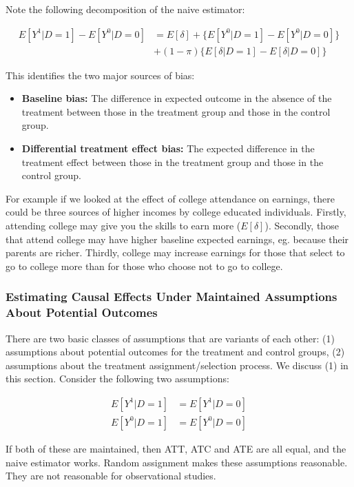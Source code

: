 \documentclass[12 pt, leqno]{article}
\begin{document}
Note the following decomposition of the naive estimator:

\begin{align*}
E[Y^1|D=1] - E[Y^0|D = 0] &= E[\delta] + \{E[Y^0|D = 1] - E[Y^0|D = 0] \} \\
&+ (1-\pi)\{E[\delta|D = 1] - E[\delta | D = 0] \}
\end{align*}

This identifies the two major sources of bias:

\begin{itemize}
\item \textbf{Baseline bias:} The difference in expected outcome in the absence of the treatment between those in the treatment group and those in the control group.

\item \textbf{Differential treatment effect bias:} The expected difference in the treatment effect between those in the treatment group and those in the control group. 
\end{itemize}

For example if we looked at the effect of college attendance on earnings, there could be three sources of higher incomes by college educated individuals. Firstly, attending college may give you the skills to earn more ($E[\delta]$). Secondly, those that attend college may have higher baseline expected earnings, eg. because their parents are richer. Thirdly, college may increase earnings for those that select to go to college more than for those who choose not to go to college. 

\subsubsection{Estimating Causal Effects Under Maintained Assumptions About Potential Outcomes}

There are two basic classes of assumptions that are variants of each other: (1) assumptions about potential outcomes for the treatment and control groups, (2) assumptions about the treatment assignment/selection process. We discuss (1) in this section. Consider the following two assumptions:

\begin{align*}
E[Y^1|D =1]&= E[Y^1|D = 0] \\
E[Y^0|D =1]&= E[Y^0|D = 0]
\end{align*}

If both of these are maintained, then ATT, ATC and ATE are all equal, and the naive estimator works. Random assignment makes these assumptions reasonable. They are not reasonable for observational studies. 
\end{document}
